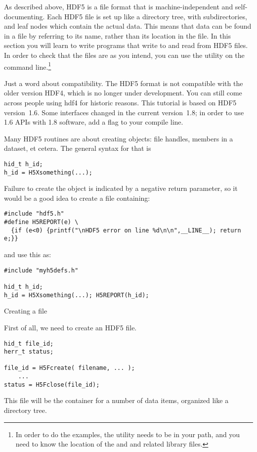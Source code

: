 As described above, HDF5 is a file format that is machine-independent
and self-documenting. Each HDF5 file is set up like a directory tree,
with subdirectories, and leaf nodes which contain the actual
data. This means that data can be found in a file by referring to its
name, rather than its location in the file. In this section you will
learn to write programs that write to and read from HDF5 files. In
order to check that the files are as you intend, you can use the
 utility on the command line.\footnote{In order to do the
  examples, the  utility needs to be in your path, and you
  need to know the location of the  and  and
  related library files.}

Just a word about compatibility. The HDF5 format is not compatible
with the older version HDF4, which is no longer under development. You
can still come across people using hdf4 for historic reasons. This
tutorial is based on HDF5 version~1.6. Some interfaces changed in the
current version~1.8; in order to use 1.6 APIs with 1.8 software, add a
flag  to your compile line.

Many HDF5 routines are about creating objects: file handles, members
in a dataset, et cetera. The general syntax for that is
\begin{verbatim}
hid_t h_id;
h_id = H5Xsomething(...);
\end{verbatim}
Failure to create the object is indicated by a negative return
parameter, so it would be a good idea to create a file
  containing:
\begin{verbatim}
#include "hdf5.h"
#define H5REPORT(e) \
  {if (e<0) {printf("\nHDF5 error on line %d\n\n",__LINE__); return e;}}
\end{verbatim}
and use this as:
\begin{verbatim}
#include "myh5defs.h"

hid_t h_id;
h_id = H5Xsomething(...); H5REPORT(h_id);
\end{verbatim}

 {Creating a file}

First of all, we need to create an HDF5 file.
\begin{verbatim}
hid_t file_id;
herr_t status;

file_id = H5Fcreate( filename, ... );
    ...
status = H5Fclose(file_id); 
\end{verbatim}
This file will be the container for a number of data items, organized
like a directory tree.

